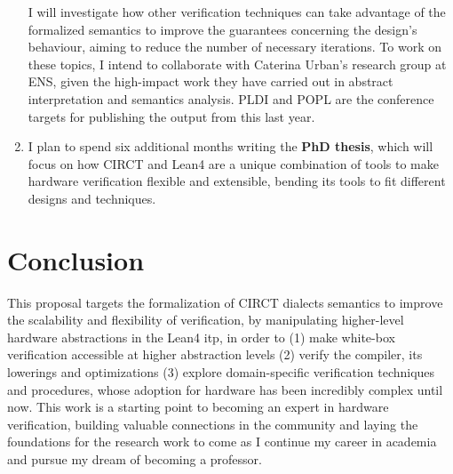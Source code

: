 \documentclass[sigconf,authorversion,nonacm, 11pt]{acmart}
\begin{document}
\begin{enumerate}
    I will investigate how other verification techniques can take advantage of the formalized semantics to improve the guarantees concerning the design's behaviour, aiming to reduce the number of necessary iterations. 
    To work on these topics, I intend to collaborate with Caterina Urban's research group at ENS, given the high-impact work they have carried out in abstract interpretation and semantics analysis. 
    PLDI and POPL are the conference targets for publishing the output from this last year. 
    \item I plan to spend six additional months writing the \textbf{PhD thesis}, which will focus on how CIRCT and Lean4 are a unique combination of tools to make hardware verification flexible and extensible, bending its tools to fit different designs and techniques.
\end{enumerate}

\section{Conclusion}
This proposal targets the formalization of CIRCT dialects semantics to improve the scalability and flexibility of verification, by manipulating higher-level hardware abstractions in the Lean4 \ac{itp}, in order to 
(1) make white-box verification accessible at higher abstraction levels
(2) verify the compiler, its lowerings and optimizations 
(3) explore domain-specific verification techniques and procedures, whose adoption for hardware has been incredibly complex until now. 
This work is a starting point to becoming an expert in hardware verification, building valuable connections in the community and laying the foundations for the research work to come as I continue my career in academia and pursue my dream of becoming a professor.

\thispagestyle{empty}


\thispagestyle{empty}
\end{document}
